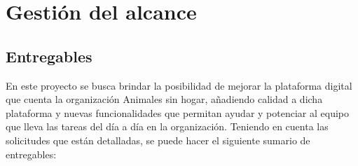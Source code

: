 \section{Gestión del alcance}

\subsection{Entregables}
En este proyecto se busca brindar la posibilidad de mejorar la plataforma digital que cuenta la organización Animales sin hogar, añadiendo calidad a dicha plataforma y nuevas funcionalidades que permitan ayudar y potenciar al equipo que lleva las tareas del día a día en la organización.
Teniendo en cuenta las solicitudes que están detalladas, se puede hacer el siguiente sumario de entregables:


